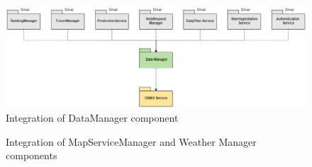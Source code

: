 \documentclass[table, 12pt]{article}
\begin{document}
\begin{figure}[H]
    \includegraphics[scale=0.5, center]{assets/Test/generalTest.png}
    \caption{Integration of DataManager component}
    \label{fig: integration_DataManager}
\end{figure}

\begin{figure}[H]
    \centering
    \qquad\qquad
    \caption{Integration of MapServiceManager and Weather Manager components}%
    \label{fig: integration_MapServiceManager_WeatherManager}%
\end{figure}
\end{document}
